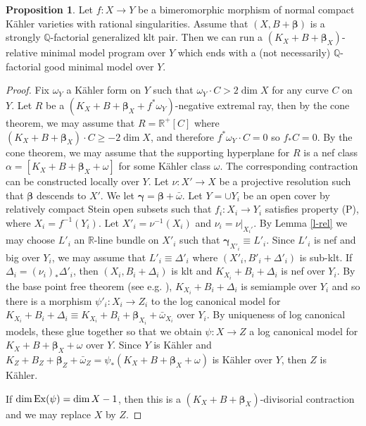 \documentclass[11pt]{amsart}
\numberwithin{equation}{section}
\def\bbeta{\boldsymbol{\beta}}
\def\ggamma{\boldsymbol{\gamma}}
\def\dim{\operatorname{dim}}
\newcommand\Q{{\mathbb{Q}}}
\newcommand\R{{\mathbb{R}}}
\theoremstyle{definition}
\theoremstyle{definition}
\newtheorem{proposition}[theorem]{Proposition}
\theoremstyle{definition}
\begin{document}
\begin{proposition} \label{c-relmmp} Let $f:X\to Y$ be a bimeromorphic morphism of normal compact K\"ahler varieties with rational singularities. Assume that $(X,B+\bbeta )$ is a strongly $\Q$-factorial generalized klt pair. Then we can run a $(K_X+B+\bbeta_X)$-relative minimal model program over $Y$ which ends with a (not necessarily) $\Q$-factorial good minimal model over $Y$. %
\end{proposition} \begin{proof} Fix $\omega _Y$ a K\"ahler form on $Y$ such that $\omega _Y\cdot C>2\dim X$ for any curve $C$ on $Y$. Let $R$ be a $(K_X+B+\bbeta_X+f^*\omega _Y )$-negative extremal ray, then by the cone theorem, we may assume that $R=\mathbb R^+[C]$ where $(K_X+B+\bbeta _X)\cdot C\geq -2\dim X$, and therefore $f^*\omega_Y \cdot C=0$ so $f_*C=0$. By the cone theorem, we may assume that the supporting hyperplane for $R$ is a nef class $\alpha=[K_X+B+\bbeta _X+\omega]$ for some K\"ahler class $\omega$. 
The corresponding contraction can be constructed locally over $Y$.
Let $\nu: X'\to X$ be a projective resolution such that $\bbeta$ descends to $X'$.
We let $\ggamma = \bbeta +\bar \omega $.
Let $Y=\cup Y_i$ be an open cover by relatively compact Stein open subsets such that $f_i:X_i\to Y_i$ satisfies property (P), where $X_i=f^{-1}(Y_i)$. Let $X'_i=\nu ^{-1}(X_i)$ and $\nu _i=\nu |_{X_i'}$.
By Lemma \ref{l-rel} we may choose $L'_i$ an $\R$-line bundle on $X'_i$ such that $\ggamma _{ X'_i}\equiv L'_i$. Since $L'_i$ is nef and big over $Y_i$, we may assume that $L'_i\equiv \Delta '_i$ where $( X'_i,B'_i+ \Delta' _i)$ is sub-klt. If $\Delta _i=(\nu  _i)_*\Delta' _i$, then $(X_i,B_i+\Delta _i)$ is klt and $K_{X_i}+B_i+\Delta _i$ is nef over $Y_i$. By the base point free theorem (see e.g. \cite[Theorem 6.2, Remark 6.3]{Fuj22}), $K_{X_i}+B_i+\Delta _i$ is semiample over $Y_i$ and so there is a morphism $\psi' _i:X_i\to Z_i$ to the log canonical model for $K_{X_i}+B_i+\Delta _i\equiv K_{X_i}+B_i+\bbeta _{X_i}+\bar\omega _{X_i}$ over $Y_i$.  By uniqueness of log canonical models, these glue together so that we obtain $\psi :X\to Z$ a log canonical model for $K_{X}+B+\bbeta _{X}+\omega$ over $Y$. Since $Y$ is K\"ahler and $K_Z+B_Z+\bbeta _Z+\bar \omega _Z=\psi _*(K_X+B+\bbeta _X+\omega )$ is K\"ahler over $Y$, then $Z$  is K\"ahler.


If $\dim {\rm Ex}(\psi)=\dim X-1$, then this is a { $(K_X+B+\bbeta_X)$-}divisorial contraction and we may replace $X$ by $Z$.



\end{proof}
\end{document}
